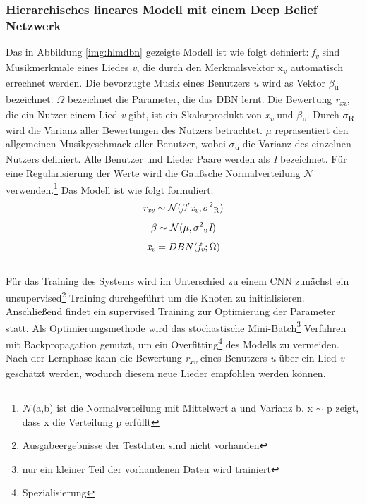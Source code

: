 \documentclass[twosided,a4,10pt]{article}
\begin{document}
\begin{multicols}{2}
		\subsubsection{Hierarchisches lineares Modell mit einem Deep Belief Netzwerk}
		Das in Abbildung \ref{img:hlmdbn} gezeigte Modell ist wie folgt definiert: \textit{f\textsubscript{v}} sind Musikmerkmale eines Liedes \textit{v}, die durch den Merkmalsvektor x\textsubscript{v} automatisch errechnet werden. Die bevorzugte Musik eines Benutzers \textit{u} wird as Vektor $\beta$\textsubscript{u} bezeichnet. $\Omega$ bezeichnet die Parameter, die das DBN lernt. Die Bewertung \textit{r\textsubscript{xv}}, die ein Nutzer einem Lied \textit{v} gibt, ist ein Skalarprodukt von \textit{x\textsubscript{v}} und $\beta$\textsubscript{u}. Durch $\sigma$\textsubscript{R} wird die Varianz aller Bewertungen des Nutzers betrachtet. $\mu$ repräsentiert den allgemeinen Musikgeschmack aller Benutzer, wobei $\sigma$\textsubscript{u} die Varianz des einzelnen Nutzers definiert. Alle Benutzer und Lieder Paare werden als \textit{I} bezeichnet. Für eine Regularisierung der Werte wird die Gaußsche Normalverteilung $\mathcal{N}$ verwenden.\footnote[14]{$\mathcal{N}$(a,b) ist die Normalverteilung mit Mittelwert a und Varianz b. x $\sim$ p zeigt, dass x die Verteilung p erfüllt} \cite{wang}\newline Das Modell ist wie folgt formuliert:\newline
		\begin{equation*}
			\centering
			\textit{r\textsubscript{xv}}\sim\mathcal{N}(\beta'\textit{x\textsubscript{v}},\sigma\textsuperscript{2}\textsubscript{R})
		\end{equation*}
		\begin{equation*}
		\centering
			\beta\sim\mathcal{N}(\mu,\sigma\textsuperscript{2}\textsubscript{u}\textit{I})
		\end{equation*}
		\begin{equation*}
			\textit{x\textsubscript{v}} = DBN(\textit{f\textsubscript{v}};\Omega)
		\end{equation*}\newline\\
		Für das Training des Systems wird im Unterschied zu einem CNN zunächst ein unsupervised\footnote[15]{Ausgabeergebnisse der Testdaten sind nicht vorhanden} Training durchgeführt um die Knoten zu initialisieren. Anschließend findet ein supervised Training zur Optimierung der Parameter statt. Als Optimierungsmethode wird das stochastische Mini-Batch\footnote[16]{nur ein kleiner Teil der vorhandenen Daten wird trainiert} Verfahren mit Backpropagation genutzt, um ein Overfitting\footnote[17]{Spezialisierung} des Modells zu vermeiden. Nach der Lernphase kann die Bewertung \textit{r\textsubscript{xv}} eines Benutzers \textit{u} über ein Lied \textit{v} geschätzt werden, wodurch diesem neue Lieder empfohlen werden können. \cite{wang}

\end{multicols}
\end{document}

